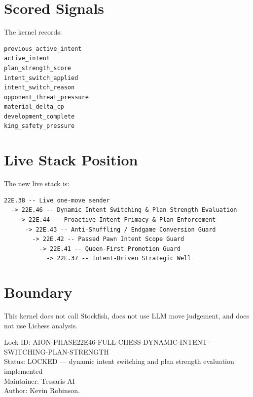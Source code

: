 \documentclass[11pt,a4paper]{article}
\begin{document}
\section{Scored Signals}

The kernel records:

\begin{verbatim}
previous_active_intent
active_intent
plan_strength_score
intent_switch_applied
intent_switch_reason
opponent_threat_pressure
material_delta_cp
development_complete
king_safety_pressure
\end{verbatim}

\section{Live Stack Position}

The new live stack is:

\begin{verbatim}
22E.38 -- Live one-move sender
  -> 22E.46 -- Dynamic Intent Switching & Plan Strength Evaluation
    -> 22E.44 -- Proactive Intent Primacy & Plan Enforcement
      -> 22E.43 -- Anti-Shuffling / Endgame Conversion Guard
        -> 22E.42 -- Passed Pawn Intent Scope Guard
          -> 22E.41 -- Queen-First Promotion Guard
            -> 22E.37 -- Intent-Driven Strategic Well
\end{verbatim}

\section{Boundary}

This kernel does not call Stockfish, does not use LLM move judgement, and does not use Lichess analysis.

\bigskip

\noindent
Lock ID: AION-PHASE22E46-FULL-CHESS-DYNAMIC-INTENT-SWITCHING-PLAN-STRENGTH\\
Status: LOCKED --- dynamic intent switching and plan strength evaluation implemented\\
Maintainer: Tessaris AI\\
Author: Kevin Robinson.
\end{document}
